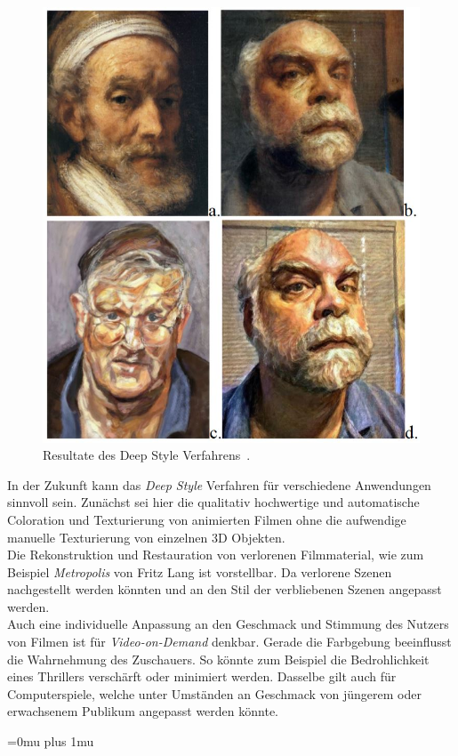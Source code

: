 \documentclass[times, 11pt,twocolumn]{article}
\begin{document}
\begin{figure}
	\flushleft
	\includegraphics[width=\columnwidth]{Bilder/DeepStyleResults.JPG}
	\caption{Resultate des Deep Style Verfahrens~\cite{McCaigDG16}.}
	\label{fig:DeepStyleResults}
\end{figure}


In der Zukunft kann das \textit{Deep Style} Verfahren für verschiedene Anwendungen sinnvoll sein. Zunächst sei hier die qualitativ hochwertige und automatische Coloration und Texturierung von animierten Filmen ohne die aufwendige manuelle Texturierung von einzelnen 3D Objekten. \\
Die Rekonstruktion und Restauration von verlorenen Filmmaterial, wie zum Beispiel \textit{Metropolis} von Fritz Lang ist vorstellbar. Da verlorene Szenen nachgestellt werden könnten und an den Stil der verbliebenen Szenen angepasst werden.\\
Auch eine individuelle Anpassung an den Geschmack und Stimmung des Nutzers von Filmen ist für \textit{Video-on-Demand} denkbar. Gerade die Farbgebung beeinflusst die Wahrnehmung des Zuschauers. So könnte zum Beispiel die Bedrohlichkeit eines Thrillers verschärft oder minimiert werden. Dasselbe gilt auch für Computerspiele, welche unter Umständen an Geschmack von jüngerem oder erwachsenem Publikum angepasst werden könnte.

 \label{Fazit}



\newpage
\Urlmuskip=0mu plus 1mu\relax %
 

\end{document}
